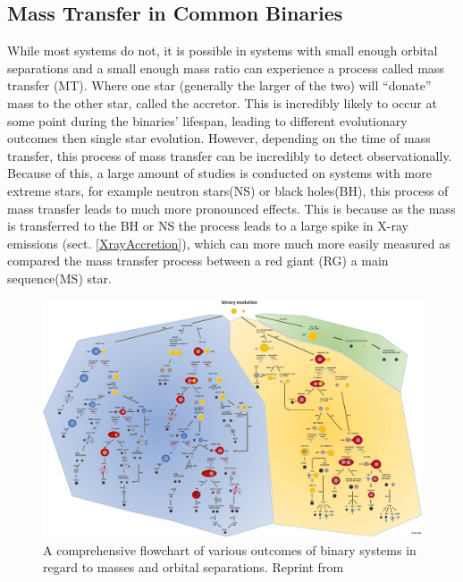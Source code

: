 \documentclass[12pt, letterpaper]{article}
\begin{document}
    \subsection{Mass Transfer in Common Binaries} \label{MassTransferinCommon}
    While most systems do not, it is possible in systems with small enough orbital separations and a small enough mass ratio can experience a process called mass transfer (MT). Where one star (generally the larger of the two) will ``donate'' mass to the other star, called the accretor. This is incredibly likely to occur at some point during the binaries' lifespan, leading to different evolutionary outcomes then single star evolution. However, depending on the time of mass transfer, this process of mass transfer can be incredibly to detect observationally. Because of this, a large amount of studies is conducted on systems with more extreme stars, for example neutron stars(NS) or black holes(BH), this process of mass transfer leads to much more pronounced effects. This is because as the mass is transferred to the BH or NS the process leads to a large spike in X-ray emissions (sect. \ref{XrayAccretion}), which can more much more easily measured as compared the mass transfer process between a red giant (RG) a main sequence(MS) star.

    \vspace*{\fill}
    \begin{figure}[H]
        \centering
        \includegraphics[width=\textwidth]{figs/Binary Evolution Flowchart.jpg}
        \caption{A comprehensive flowchart of various outcomes of binary systems in regard to masses and orbital separations. Reprint from \cite{Chen_2024}}
        \label{fig:binary_evolution_flowchart}
    \end{figure}
    \vspace*{\fill}
    \restoregeometry
\end{document}
